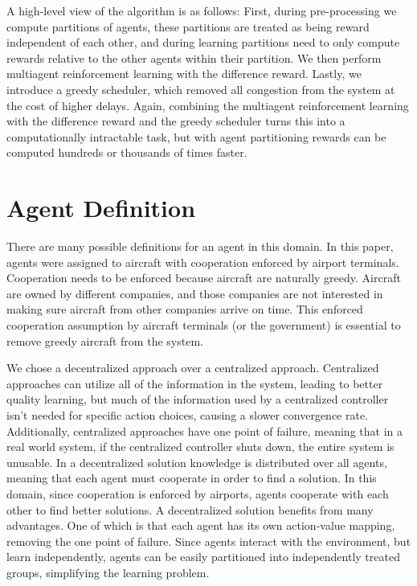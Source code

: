 \documentclass[onehalf,11pt]{beavtex}
\begin{document}
A high-level view of the algorithm is as follows: First, during pre-processing we compute partitions of agents, these partitions are treated as being reward independent of each other, and during learning partitions need to only compute rewards relative to the other agents within their partition. We then perform multiagent reinforcement learning with the difference reward. Lastly, we introduce a greedy scheduler, which removed all congestion from the system at the cost of higher delays. Again, combining the multiagent reinforcement learning with the difference reward and the greedy scheduler turns this into a computationally intractable task, but with agent partitioning rewards can be computed hundreds or thousands of times faster.

\section{Agent Definition}
There are many possible definitions for an agent in this domain. In this paper, agents were assigned to aircraft with cooperation enforced by airport terminals. Cooperation needs to be enforced because aircraft are naturally greedy. Aircraft are owned by different companies, and those companies are not interested in making sure aircraft from other companies arrive on time. This enforced cooperation assumption by aircraft terminals (or the government) is essential to remove greedy aircraft from the system.

We chose a decentralized approach over a centralized approach. Centralized approaches can utilize all of the information in the system, leading to better quality learning, but much of the information used by a centralized controller isn't needed for specific action choices, causing a slower convergence rate. Additionally, centralized approaches have one point of failure, meaning that in a real world system, if the centralized controller shuts down, the entire system is unusable. In a decentralized solution knowledge is distributed over all agents, meaning that each agent must cooperate in order to find a solution. In this domain, since cooperation is enforced by airports, agents cooperate with each other to find better solutions. A decentralized solution benefits from many advantages. One of which is that each agent has its own action-value mapping, removing the one point of failure.  Since agents interact with the environment, but learn independently, agents can be easily partitioned into independently treated groups, simplifying the learning problem.  
\end{document}
